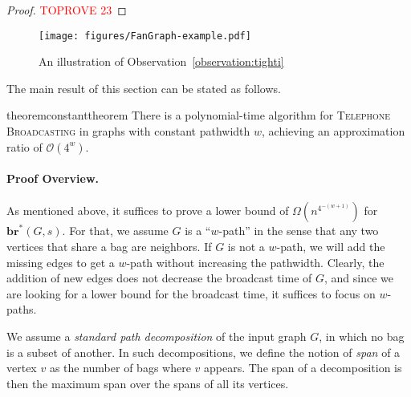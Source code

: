 \documentclass[letterpaper,11pt]{article}
\newcommand{\bropt}{{\boldsymbol{br}^*}}
\newcommand{\oh}{\mathcal{O}}
\newcommand{\telebr}{\textsc{Telephone Broadcasting}\xspace}
\newcommand{\pwidth}{w}
\begin{document}
\begin{proof}\textcolor{red}{TOPROVE 23}\end{proof}

\begin{figure}
	\centering
\texttt{[image: figures/FanGraph-example.pdf]}
	\caption{An illustration of Observation~\ref{observation:tighti}}
    \label{fig:fangraph-example}
\end{figure}

The main result of this section can be stated as follows.

\begin{restatable}{theorem}{constanttheorem}\label{thm:approximation-constant}
There is a polynomial-time algorithm for \telebr in graphs with constant pathwidth $\pwidth$, achieving an approximation ratio of $\oh(4^{\pwidth})$.
\end{restatable}

\paragraph{Proof Overview.}
As mentioned above, it suffices to prove a lower bound of $\Omega(n^{4^{-(w+1)}})$ for $\bropt(G,s)$. 
For that, we assume $G$ is a ``$\pwidth$-path'' in the sense that any two vertices that share a bag are neighbors. If $G$ is not a $\pwidth$-path, we will add the missing edges to get a $\pwidth$-path without increasing the pathwidth.
 Clearly, the addition of new edges does not decrease the broadcast time of $G$, and since we are looking for a lower bound for the broadcast time, it suffices to focus on $\pwidth$-paths.

We assume a \emph{standard path decomposition} of the input graph $G$, in which no bag is a subset of another. In such decompositions, we define the notion of \emph{span} of a vertex $v$ as the number of bags where $v$ appears. The span of a decomposition is then the maximum span over the spans of all its vertices. 
\end{document}

